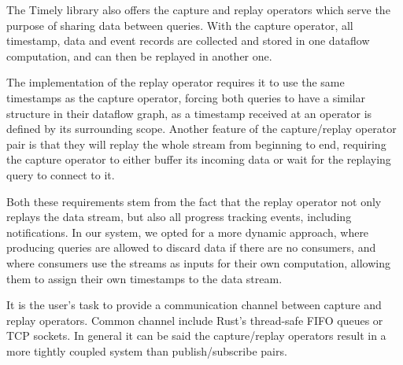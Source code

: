 The Timely library also offers the capture and replay operators which serve the
purpose of sharing data between queries. With the capture operator, all timestamp,
data and event records are collected and stored in one dataflow computation,
and can then be replayed in another one.

The implementation of the replay operator requires it to use the same timestamps
as the capture operator, forcing both queries to have a similar structure
in their dataflow graph, as a timestamp received at an operator is defined
by its surrounding scope. Another feature of the capture/replay operator pair
is that they will replay the whole stream from beginning to end, requiring the
capture operator to either buffer its incoming data or wait for the replaying
query to connect to it. 

Both these requirements stem from the fact that the replay operator not only
replays the data stream, but also all progress tracking events, including
notifications. In our system, we opted for a more dynamic approach, where
producing queries are allowed to discard data if there are no consumers, and
where consumers use the streams as inputs for their own computation,
allowing them to assign their own timestamps to the data stream.

It is the user's task to provide a communication channel between capture and 
replay operators. Common channel include Rust's thread-safe FIFO queues or
TCP sockets. In general it can be said the capture/replay operators result
in a more tightly coupled system than publish/subscribe pairs.


